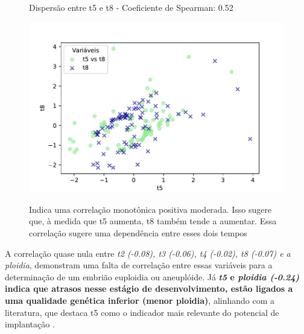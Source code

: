 \begin{figure}[h]
\begin{minipage}[b]{0.45\linewidth}
        \caption{Dispersão entre t5 e t8 - Coeficiente de Spearman: 0.52}
        \label{fig:t5-t8}
        \centering
        \includegraphics[scale=0.48]{figuras/Spearman/t5-t8.pdf}
        \vspace{0.3cm}
        \caption{Indica uma correlação monotônica positiva moderada. Isso sugere que, à medida que t5 aumenta, t8 também tende a aumentar. Essa correlação sugere uma dependência entre esses dois tempos}
        \begin{minipage}{\linewidth}
            \centering
        \end{minipage}
    \end{minipage}
\end{figure}
\FloatBarrier

A correlação quase nula entre \textit{t2 (-0.08), t3 (-0.06), t4 (-0.02), t8 (-0.07) e a ploidia}, demonstram uma falta de correlação entre essas variáveis para a determinação de um embrião euploidia ou aneuplóide. Já \textbf{\textit{t5} e \textit{ploidia (-0.24)} indica que atrasos nesse estágio de desenvolvimento, estão ligados a uma qualidade genética inferior (menor ploidia)}, alinhando com a literatura, que destaca t5 como o indicador mais relevante do potencial de implantação . 


